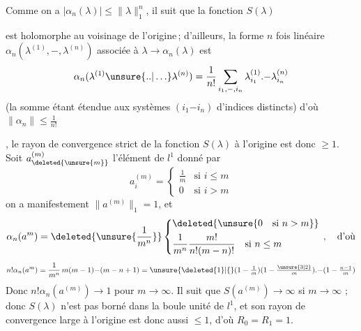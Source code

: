 Comme on a $|\alpha_n(\lambda)|\leq\|\lambda\|_1^n$, il suit que
la fonction $S(\lambda)$ 
est holomorphe au voisinage
de l'origine\,; d'ailleurs, la forme $n$ fois linéaire
$\alpha_n(\lambda^{(1)},\mathord{-},\lambda^{(n)})$ associée à
$\lambda\to\alpha_n(\lambda)$ est
\[
\alpha_n(\lambda^{(1)}\unsure{\mathord{.}\mathord{.}|\ldots}\lambda^{(n)})
=\frac{1}{n!}\sum_{i_1,\mathord{-},i_n}
\lambda^{(1)}_{i_1}\mathord{.}\mathord{-}\lambda^{(n)}_{i_n}
\]
(la somme étant étendue aux systèmes $(i_1\mathord{-}i_n)$ d'indices distincts)
d'où $\|\alpha_n\|\leq\frac{1}{n!}$
,
le rayon de convergence
strict  de la fonction $S(\lambda)$ à l'origine est
donc  $\geq1$.
Soit  $a_{\deleted{\unsure{m}}}^{(m)}$ l'élément de $l^1$
 donné par
\[
a_i^{(m)}=\begin{cases}
\frac{1}{m}&\text{si }i\leq m\\
0&\text{si }i>m
\end{cases}
\]
on a manifestement $\|a^{(m)}\|_1=1$, et
\[
\alpha_n(a^m)=\deleted{\unsure{\frac{1}{m^n}}}
\left\{\begin{aligned}
&\deleted{\unsure{0\quad\text{si }n>m}}\\
&\frac{1}{m^n}\frac{m!}{n!(m-n)!}\quad\text{si }n\leq m
\end{aligned}\right.\,,\quad\text{d'où}
\]
\[
n!\alpha_n(a^m)=\frac{1}{m^n}\,m(m-1)\mathord{-}(m-n+1)
=\unsure{\deleted{1}|\lbrace}
(1-\tfrac{1}{m})(1-\tfrac{\unsure{3|2}}{m})
\mathord{.}\mathord{-}(1-\tfrac{n-1}{m})
\]
Donc $n!\alpha_n(a^{(m)})\to1$ pour $m\to\infty$.
Il suit que $S(a^{(m)})\to\infty$ si $m\to\infty$ ;
donc $S(\lambda)$ n'est pas borné dans la boule
unité de $l^1$, et son rayon de convergence
large  à l'origine est donc aussi $\leq1$, d'où $R_0=R_1=1$.




